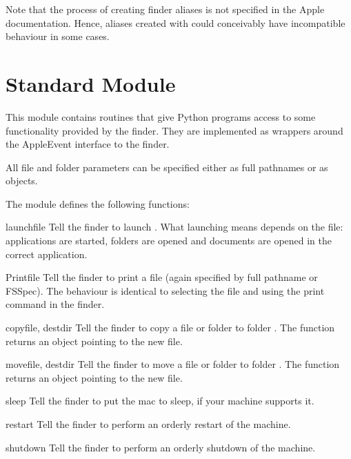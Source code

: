 Note that the process of creating finder aliases is not specified in
the Apple documentation. Hence, aliases created with 
could conceivably have incompatible behaviour in some cases.

\section{Standard Module }
\label{module-findertools}

This module contains routines that give Python programs access to some
functionality provided by the finder. They are implemented as wrappers
around the AppleEvent interface to the finder.

All file and folder parameters can be specified either as full
pathnames or as  objects.

The  module defines the following functions:


\begin{funcdesc}{launch}{file}
Tell the finder to launch . What launching means depends on the file:
applications are started, folders are opened and documents are opened
in the correct application.
\end{funcdesc}

\begin{funcdesc}{Print}{file}
Tell the finder to print a file (again specified by full pathname or
FSSpec). The behaviour is identical to selecting the file and using
the print command in the finder.
\end{funcdesc}

\begin{funcdesc}{copy}{file, destdir}
Tell the finder to copy a file or folder  to folder
. The function returns an  object pointing to
the new file.
\end{funcdesc}

\begin{funcdesc}{move}{file, destdir}
Tell the finder to move a file or folder  to folder
. The function returns an  object pointing to
the new file.
\end{funcdesc}

\begin{funcdesc}{sleep}{}
Tell the finder to put the mac to sleep, if your machine supports it.
\end{funcdesc}

\begin{funcdesc}{restart}{}
Tell the finder to perform an orderly restart of the machine.
\end{funcdesc}

\begin{funcdesc}{shutdown}{}
Tell the finder to perform an orderly shutdown of the machine.
\end{funcdesc}

